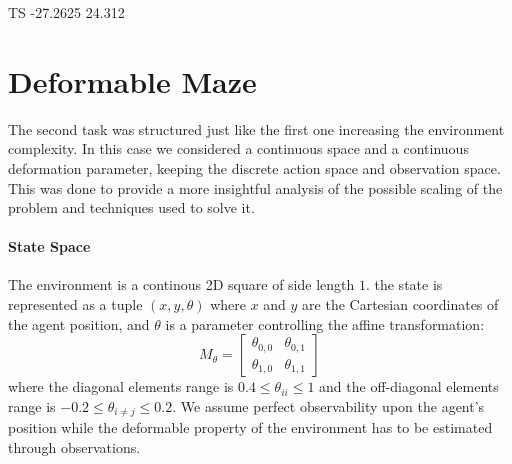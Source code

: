 TS
-27.2625 24.312


\section{Deformable Maze}
The second task was structured just like the first one increasing the environment complexity.
In this case we considered a continuous space and a continuous deformation parameter, 
keeping the discrete action space and observation space. This was done to provide 
a more insightful analysis of the possible scaling of the problem and techniques 
used to solve it.
   
\paragraph{State Space}
The environment is a continous 2D square of side length $1$.
the state is represented as a tuple $(x,y, \theta)$ where $x$ and $y$ are the Cartesian coordinates of the agent position, 
and $\theta$ is a parameter controlling the affine transformation: 
$$M_{\theta} = 
\begin{bmatrix}
\theta_{0,0} & \theta_{0,1} \\
\theta_{1,0} & \theta_{1,1}
\end{bmatrix}
$$  
where the diagonal elements range is $0.4 \leq \theta_{ii} \leq 1$ and the 
off-diagonal elements range is $-0.2 \leq \theta_{i\neq j} \leq 0.2$.
We assume perfect observability upon the agent's position while the deformable property 
of the environment has to be estimated through observations.

